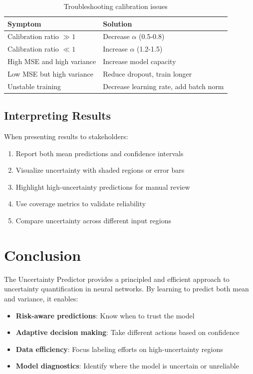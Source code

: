 \documentclass[11pt,a4paper]{article}
\begin{document}
\begin{table}[h]
\centering
\begin{tabular}{ll}
\toprule
\textbf{Symptom} & \textbf{Solution} \\
\midrule
Calibration ratio $\gg 1$ & Decrease $\alpha$ (0.5-0.8) \\
Calibration ratio $\ll 1$ & Increase $\alpha$ (1.2-1.5) \\
High MSE and high variance & Increase model capacity \\
Low MSE but high variance & Reduce dropout, train longer \\
Unstable training & Decrease learning rate, add batch norm \\
\bottomrule
\end{tabular}
\caption{Troubleshooting calibration issues}
\end{table}

\subsection{Interpreting Results}

When presenting results to stakeholders:
\begin{enumerate}
    \item Report both mean predictions and confidence intervals
    \item Visualize uncertainty with shaded regions or error bars
    \item Highlight high-uncertainty predictions for manual review
    \item Use coverage metrics to validate reliability
    \item Compare uncertainty across different input regions
\end{enumerate}

\section{Conclusion}

The Uncertainty Predictor provides a principled and efficient approach to uncertainty quantification in neural networks. By learning to predict both mean and variance, it enables:

\begin{itemize}
    \item \textbf{Risk-aware predictions}: Know when to trust the model
    \item \textbf{Adaptive decision making}: Take different actions based on confidence
    \item \textbf{Data efficiency}: Focus labeling efforts on high-uncertainty regions
    \item \textbf{Model diagnostics}: Identify where the model is uncertain or unreliable
\end{itemize}
\end{document}
